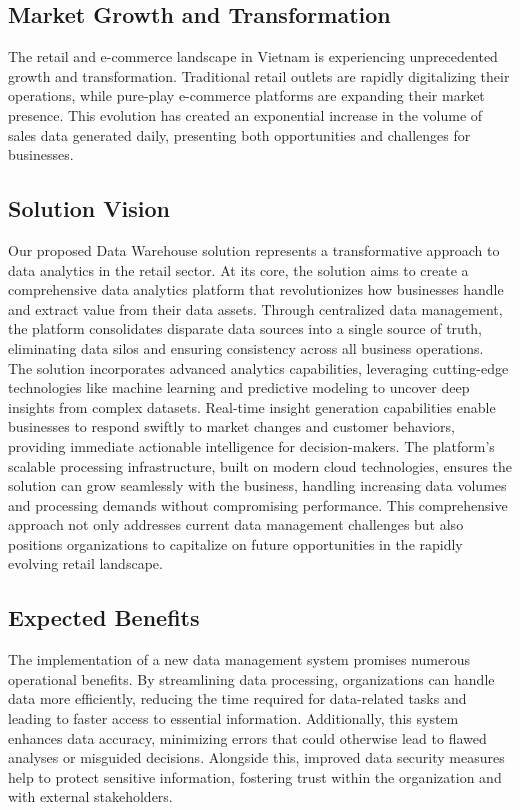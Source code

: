 \subsection{Market Growth and Transformation}
The retail and e-commerce landscape in Vietnam is experiencing unprecedented growth and
transformation. Traditional retail outlets are rapidly digitalizing their operations, while
pure-play e-commerce platforms are expanding their market presence. This evolution has created an
exponential increase in the volume of sales data generated daily, presenting both opportunities and
challenges for businesses.

\subsection{Solution Vision}
Our proposed Data Warehouse solution represents a transformative approach to data analytics in the
retail sector. At its core, the solution aims to create a comprehensive data analytics platform that
revolutionizes how businesses handle and extract value from their data assets. Through centralized
data management, the platform consolidates disparate data sources into a single source of truth,
eliminating data silos and ensuring consistency across all business operations. The solution
incorporates advanced analytics capabilities, leveraging cutting-edge technologies like machine
learning and predictive modeling to uncover deep insights from complex datasets. Real-time insight
generation capabilities enable businesses to respond swiftly to market changes and customer
behaviors, providing immediate actionable intelligence for decision-makers. The platform's scalable
processing infrastructure, built on modern cloud technologies, ensures the solution can grow
seamlessly with the business, handling increasing data volumes and processing demands without
compromising performance. This comprehensive approach not only addresses current data management
challenges but also positions organizations to capitalize on future opportunities in the rapidly
evolving retail landscape.

\subsection{Expected Benefits}
The implementation of a new data management system promises numerous operational benefits. By
streamlining data processing, organizations can handle data more efficiently, reducing the time
required for data-related tasks and leading to faster access to essential information. Additionally,
this system enhances data accuracy, minimizing errors that could otherwise lead to flawed analyses
or misguided decisions. Alongside this, improved data security measures help to protect sensitive
information, fostering trust within the organization and with external stakeholders.

